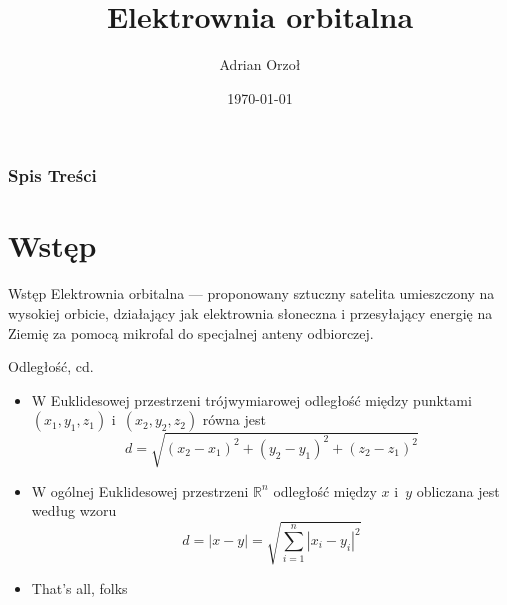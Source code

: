 \documentclass{beamer}
\title{Elektrownia orbitalna}
\author{Adrian Orzoł}
\institute{UWM}
\date{\today}
\begin{document}
\frame{\titlepage}



\begin{frame}
\frametitle{Spis Treści}
\tableofcontents
\end{frame}



\section{Wstęp}
\begin{frame}{Wstęp}
Elektrownia orbitalna --- proponowany sztuczny satelita umieszczony na wysokiej orbicie, działający jak elektrownia słoneczna i przesyłający energię na Ziemię za pomocą mikrofal do specjalnej anteny odbiorczej.
\end{frame}

\begin{frame}{Odległość, cd.}
\begin{itemize}
\item<2-3> W Euklidesowej przestrzeni trójwymiarowej odległość między punktami $(x_1, y_1, z_1)$ i~$(x_2, y_2, z_2)$ równa jest
$$d=\sqrt{(x_2-x_1)^2+(y_2-y_1)^2+(z_2-z_1)^2}$$
\item<-3> W ogólnej Euklidesowej  przestrzeni $\mathbb{R}^n$ odległość między $x$ i~$y$ obliczana jest według wzoru
$$d=|x-y|=\sqrt{\sum^n_{i=1}{|x_i-y_i|^2}}$$
\item<4> That's all, folks
\end{itemize}
\end{frame}
\end{document}
